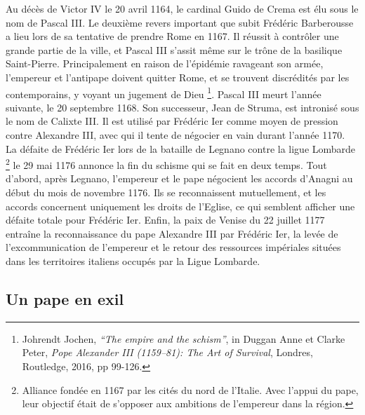 Au décès de Victor IV le 20 avril 1164, le cardinal Guido de Crema est élu sous le nom de Pascal III. Le deuxième revers important que subit Frédéric Barberousse a lieu lors de sa tentative de prendre Rome en 1167. Il réussit à contrôler une grande partie de la ville, et Pascal III s'assit même sur le trône de la basilique Saint-Pierre. Principalement en raison de l’épidémie ravageant son armée, l’empereur et l’antipape doivent quitter Rome, et se trouvent discrédités par les contemporains, y voyant un jugement de Dieu \footnote{Johrendt Jochen, \textit{“The empire and the schism”}, in Duggan Anne et Clarke Peter, \textit{Pope Alexander III (1159–81): The Art of Survival}, Londres, Routledge, 2016, pp 99-126.}. Pascal III meurt l’année suivante, le 20 septembre 1168. Son successeur, Jean de Struma, est intronisé sous le nom de Calixte III. Il est utilisé par Frédéric Ier comme moyen de pression contre Alexandre III, avec qui il tente de négocier en vain durant l’année 1170.\\
La défaite de Frédéric Ier lors de la bataille de Legnano contre la ligue Lombarde \footnote{Alliance fondée en 1167 par les cités du nord de l’Italie. Avec l’appui du pape, leur objectif était de s’opposer aux ambitions de l’empereur dans la région.} le 29 mai 1176 annonce la fin du schisme qui se fait en deux temps. Tout d’abord, après Legnano, l’empereur et le pape négocient les accords d'Anagni au début du mois de novembre 1176. Ils se reconnaissent mutuellement, et les accords concernent uniquement les droits de l’Eglise, ce qui semblent afficher une défaite totale pour Frédéric Ier. Enfin, la paix de Venise du 22 juillet 1177 entraîne la reconnaissance du pape Alexandre III par Frédéric Ier, la levée de l’excommunication de l’empereur et le retour des ressources impériales situées dans les territoires italiens occupés par la Ligue Lombarde. 




    \subsection{Un pape en exil}


